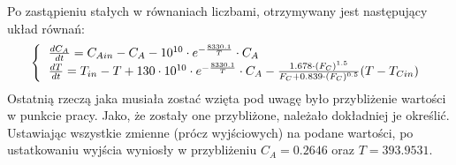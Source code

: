 Po zastąpieniu stałych w równaniach liczbami, otrzymywany jest następujący układ równań:\\
\begin{equation}
	\left\{
	\begin{tabular}{l}
	$\frac{dC_A}{dt} = C_{Ain} - C_A - 10^{10}\cdot e^{-\frac{8330.1}{T}}\cdot C_A$\\
	$\frac{dT}{dt} = T_{in} - T + 130\cdot 10^{10}\cdot e^{-\frac{8330.1}{T}}\cdot C_A-\frac{1.678\cdot (F_C)^{1.5}}{F_C+0.839\cdot (F_C)^{0.5}}(T-T_{Cin})$
	\end{tabular}
	\right.
\end{equation}
Ostatnią rzeczą jaka musiała zostać wzięta pod uwagę było przybliżenie wartości w punkcie pracy. Jako, że zostały one przybliżone, należało dokładniej je określić. Ustawiając wszystkie zmienne (prócz wyjściowych) na podane wartości, po ustatkowaniu wyjścia wyniosły  w przybliżeniu $C_A = 0.2646$ oraz $T = 393.9531$.